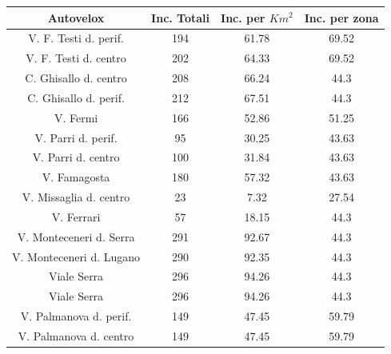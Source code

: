 \documentclass[a4paper]{report}
\begin{document}
\begin{center}
    \def\arraystretch{1.5}%
    \begin{tabular}{ |c|c|c|c| }
        \hline
        Autovelox & Inc. Totali & Inc. per $Km^2$ & Inc. per zona \\ 
        \hline
        \rowcolor{TableGray}
        V. F. Testi d. perif.\footnotemark[1]   &   194 &   61.78   &   69.52 \\
        V. F. Testi d. centro                   &   202 &   64.33   &   69.52 \\
        \rowcolor{TableGray}
        C. Ghisallo d. centro\footnotemark[2]   &   208 &   66.24   &   44.3 \\
        C. Ghisallo d. perif.                   &   212 &   67.51   &   44.3 \\
        \rowcolor{TableGray}
        V. Fermi                                &   166 &   52.86   &   51.25 \\
        V. Parri d. perif.                      &    95 &   30.25   &   43.63 \\
        \rowcolor{TableGray}
        V. Parri d. centro                      &   100 &   31.84   &   43.63 \\
        V. Famagosta                            &   180 &   57.32   &   43.63 \\
        \rowcolor{TableGray}
        V. Missaglia d. centro                  &   23  &    7.32   &   27.54 \\
        V. Ferrari                              &   57  &   18.15   &   44.3 \\
        \rowcolor{TableGray}
        V. Monteceneri d. Serra                 &   291 &   92.67   &   44.3 \\
        V. Monteceneri d. Lugano                &   290 &   92.35   &   44.3 \\
        \rowcolor{TableGray}
        Viale Serra                             &   296 &   94.26   &   44.3 \\
        Viale Serra                             &   296 &   94.26   &   44.3 \\
        \rowcolor{TableGray}
        V. Palmanova d. perif.                  &   149 &   47.45   &   59.79 \\
        V. Palmanova d. centro                  &   149 &   47.45   &   59.79 \\
        \hline
    \end{tabular}
\end{center}
\end{document}

